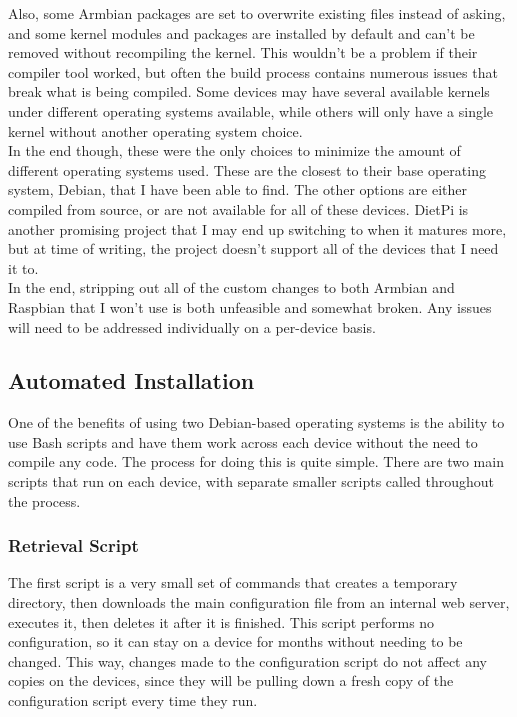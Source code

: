 \documentclass[12pt]{spieman}  %
\begin{document}
Also, some Armbian packages are set to overwrite existing files instead of asking, and some kernel modules and packages are installed by default and can’t be removed without recompiling the kernel. This wouldn't be a problem if their compiler tool worked, but often the build process contains numerous issues that break what is being compiled. Some devices may have several available kernels under different operating systems available, while others will only have a single kernel without another operating system choice.\\

In the end though, these were the only choices to minimize the amount of different operating systems used. These are the closest to their base operating system, Debian, that I have been able to find. The other options are either compiled from source, or are not available for all of these devices. DietPi is another promising project that I may end up switching to when it matures more, but at time of writing, the project doesn’t support all of the devices that I need it to.\\

In the end, stripping out all of the custom changes to both Armbian and Raspbian that I won’t use is both unfeasible and somewhat broken. Any issues will need to be addressed individually on a per-device basis.

\subsection{Automated Installation}
\label{subsec:script}

One of the benefits of using two Debian-based operating systems is the ability to use Bash scripts and have them work across each device without the need to compile any code. The process for doing this is quite simple. There are two main scripts that run on each device, with separate smaller scripts called throughout the process.

\subsubsection{Retrieval Script}
\label{subsec:retrieval}

The first script is a very small set of commands that creates a temporary directory, then downloads the main configuration file from an internal web server, executes it, then deletes it after it is finished. This script performs no configuration, so it can stay on a device for months without needing to be changed. This way, changes made to the configuration script do not affect any copies on the devices, since they will be pulling down a fresh copy of the configuration script every time they run.
\end{document}
